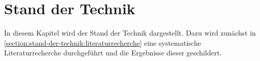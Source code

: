 \chapter{Stand der Technik}\label{section:stand-der-technik}

In diesem Kapitel wird der Stand der Technik dargestellt. Dazu wird zunächst in \autoref{section:stand-der-technik:literaturrecherche} eine systematische Literaturrecherche durchgeführt und die Ergebnisse dieser geschildert.


